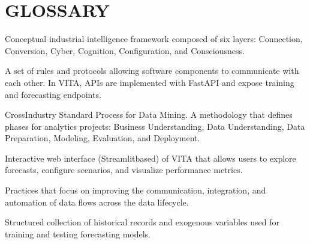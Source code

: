 \documentclass[letterpaper,10pt,english]{sphinxmanual}
\begin{document}
\sphinxstepscope


\section{GLOSSARY}
\label{\detokenize{glossary:glossary}}\label{\detokenize{glossary::doc}}\begin{description}
\sphinxAtStartPar
Conceptual industrial intelligence framework composed of six layers:
Connection, Conversion, Cyber, Cognition, Configuration, and Consciousness.

\sphinxAtStartPar
A set of rules and protocols allowing software components to communicate
with each other. In VITA, APIs are implemented with FastAPI and expose
training and forecasting endpoints.

\sphinxAtStartPar
Cross\sphinxhyphen{}Industry Standard Process for Data Mining. A methodology that defines
phases for analytics projects: Business Understanding, Data Understanding,
Data Preparation, Modeling, Evaluation, and Deployment.

\sphinxAtStartPar
Interactive web interface (Streamlit\sphinxhyphen{}based) of VITA that allows users to
explore forecasts, configure scenarios, and visualize performance metrics.

\sphinxAtStartPar
Practices that focus on improving the communication, integration, and
automation of data flows across the data lifecycle.

\sphinxAtStartPar
Structured collection of historical records and exogenous variables used
for training and testing forecasting models.


\end{description}
\end{document}
